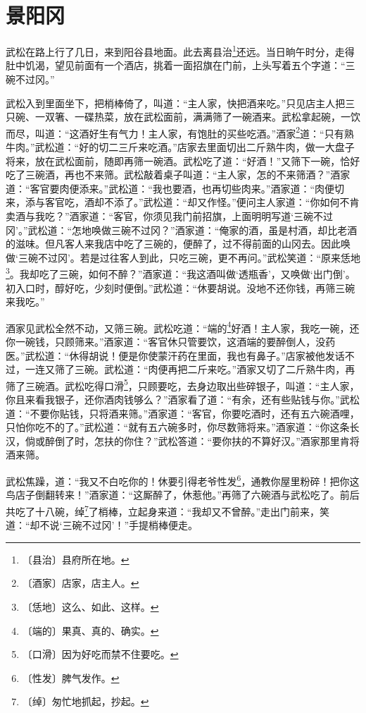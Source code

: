 \documentclass[12pt,UTF-8,openany]{ctexbook}
\begin{document}
\chapter{景阳冈}

\begin{normalsize}
    
    武松在路上行了几日，来到阳谷县地面。此去离县治\footnote{〔县治〕县府所在地。}还远。当日晌午时分，走得肚中饥渴，望见前面有一个酒店，挑着一面招旗在门前，上头写着五个字道：“三碗不过冈。”
    
    武松入到里面坐下，把梢棒倚了，叫道：“主人家，快把酒来吃。”只见店主人把三只碗、一双箸、一碟热菜，放在武松面前，满满筛了一碗酒来。武松拿起碗，一饮而尽，叫道：“这酒好生有气力！主人家，有饱肚的买些吃酒。”酒家\footnote{〔酒家〕店家，店主人。}道：“只有熟牛肉。”武松道：“好的切二三斤来吃酒。”店家去里面切出二斤熟牛肉，做一大盘子将来，放在武松面前，随即再筛一碗酒。武松吃了道：“好酒！”又筛下一碗，恰好吃了三碗酒，再也不来筛。武松敲着桌子叫道：“主人家，怎的不来筛酒？”酒家道：“客官要肉便添来。”武松道：“我也要酒，也再切些肉来。”酒家道：“肉便切来，添与客官吃，酒却不添了。”武松道：“却又作怪。”便问主人家道：“你如何不肯卖酒与我吃？”酒家道：“客官，你须见我门前招旗，上面明明写道‘三碗不过冈’。”武松道：“怎地唤做三碗不过冈？”酒家道：“俺家的酒，虽是村酒，却比老酒的滋味。但凡客人来我店中吃了三碗的，便醉了，过不得前面的山冈去。因此唤做‘三碗不过冈’。若是过往客人到此，只吃三碗，更不再问。”武松笑道：“原来恁地\footnote{〔恁地〕这么、如此、这样。}。我却吃了三碗，如何不醉？”酒家道：“我这酒叫做‘透瓶香’，又唤做‘出门倒’。初入口时，醇好吃，少刻时便倒。”武松道：“休要胡说。没地不还你钱，再筛三碗来我吃。”
    
    酒家见武松全然不动，又筛三碗。武松吃道：“端的\footnote{〔端的〕果真、真的、确实。}好酒！主人家，我吃一碗，还你一碗钱，只顾筛来。”酒家道：“客官休只管要饮，这酒端的要醉倒人，没药医。”武松道：“休得胡说！便是你使蒙汗药在里面，我也有鼻子。”店家被他发话不过，一连又筛了三碗。武松道：“肉便再把二斤来吃。”酒家又切了二斤熟牛肉，再筛了三碗酒。武松吃得口滑\footnote{〔口滑〕因为好吃而禁不住要吃。}，只顾要吃，去身边取出些碎银子，叫道：“主人家，你且来看我银子，还你酒肉钱够么？”酒家看了道：“有余，还有些贴钱与你。”武松道：“不要你贴钱，只将酒来筛。”酒家道：“客官，你要吃酒时，还有五六碗酒哩，只怕你吃不的了。”武松道：“就有五六碗多时，你尽数筛将来。”酒家道：“你这条长汉，倘或醉倒了时，怎扶的你住？”武松答道：“要你扶的不算好汉。”酒家那里肯将酒来筛。
    
    武松焦躁，道：“我又不白吃你的！休要引得老爷性发\footnote{〔性发〕脾气发作。}，通教你屋里粉碎！把你这鸟店子倒翻转来！”酒家道：“这厮醉了，休惹他。”再筛了六碗酒与武松吃了。前后共吃了十八碗，绰\footnote{〔绰〕匆忙地抓起，抄起。}了梢棒，立起身来道：“我却又不曾醉。”走出门前来，笑道：“却不说‘三碗不过冈’！”手提梢棒便走。
    

\end{normalsize}
\end{document}
